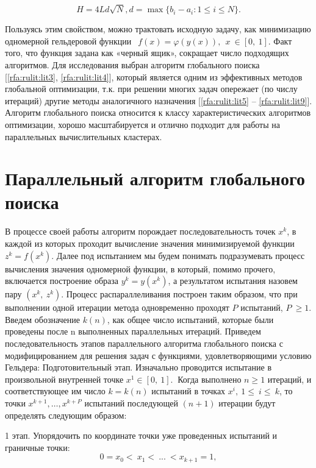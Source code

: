 \documentclass[10pt,a4paper]{book}
\begin{document}
\begin{equation}
H=4Ld\sqrt{N},d=\max\{b_i-a_i:1\leqslant i\leqslant N\}.
\end{equation}
 
 
 Пользуясь этим свойством, можно трактовать исходную задачу, как минимизацию одномерной гельдеровой функции $\ \ f\left(x\right)=\varphi\left(y\left(x\right)\right),\ \ x\ \in[0,\ 1]$.
Факт того, что функция задана как «черный ящик», сокращает число подходящих алгоритмов. Для исследования выбран алгоритм глобального поиска [\ref{rfa:rulit:lit3}, \ref{rfa:rulit:lit4}], который является одним из эффективных методов глобальной оптимизации, т.к. при решении многих задач опережает (по числу итераций) другие методы аналогичного назначения [\ref{rfa:rulit:lit5} – \ref{rfa:rulit:lit9}]. Алгоритм глобального поиска относится к классу характеристических алгоритмов оптимизации, хорошо масштабируется и отлично подходит для работы на параллельных вычислительных кластерах. 

\section{Параллельный алгоритм глобального поиска}

В процессе своей работы алгоритм порождает последовательность точек $x^k$, в каждой из которых проходит вычисление значения минимизируемой функции $z^k=f(x^k)$. Далее под испытанием мы будем понимать подразумевать процесс вычисления значения одномерной функции, в который, помимо прочего, включается построение образа $y^k=y(x^k)$, а результатом испытания назовем пару $(x^k,\ z^k)$. Процесс распараллеливания построен таким образом, что при выполнении одной итерации метода одновременно проходят $P$ испытаний, $P\ \geq1$. Введем обозначение $k(n)$, как общее число испытаний, которые были проведены после n выполненных параллельных итераций. Приведем последовательность этапов параллельного алгоритма глобального поиска с модифицированием для решения задач с функциями, удовлетворяющими условию Гельдера:
Подготовительный этап. Изначально проводится испытание в произвольной внутренней точке $x^1\in\left[0,\ 1\right].\ $ Когда выполнено $n\geq1$ итераций, и соответствующее им число $k=k(n)$ испытаний в точках $x^i,\ 1\le\ i\le\ k$, то точки $x^{k+1},\ldots,x^{k+P}$ испытаний последующей $(n+1)$ итерации будут определять следующим образом:

 1 этап. Упорядочить по координате точки уже проведенных испытаний и граничные точки:
 \begin{equation}
\label{agp1_sort}
	0=x_0<\ x_1<\ ...\ <x_{k+1}=1,
	\end{equation}
	
\end{document}
